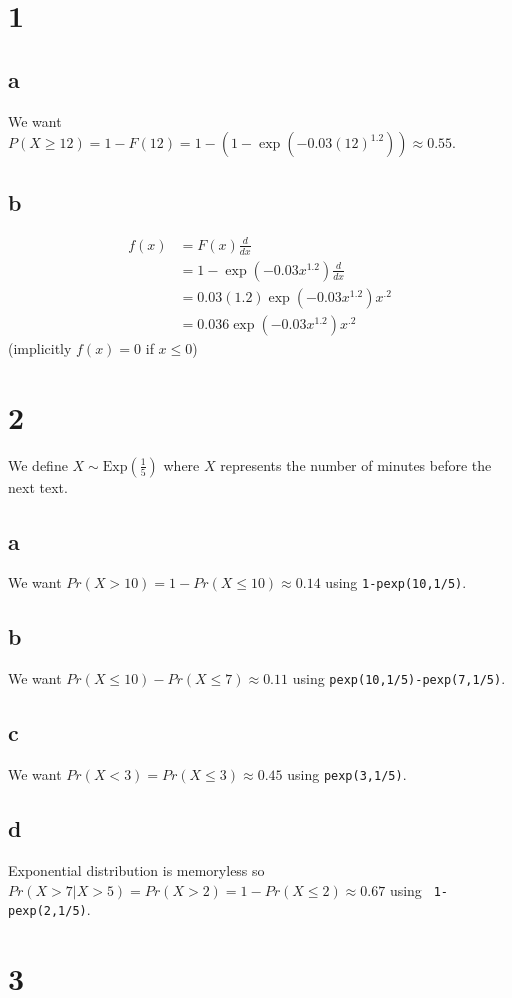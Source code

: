 \documentclass[10pt]{article}
\begin{document}
\section*{1}
\subsection*{a}
We want $P(X\ge12)=1-F(12) = 1 - (1-\exp(-0.03(12)^{1.2}))\approx0.55.$

\subsection*{b}
\begin{align*}
    f(x) &= F(x)\frac{d}{dx}\\
    &= 1-\exp(-0.03x^{1.2})\frac{d}{dx}\\
    &=0.03(1.2)\exp(-0.03x^{1.2})x^{.2}\\
    &= 0.036\exp(-0.03x^{1.2})x^{.2}
\end{align*}
\noindent
(implicitly $f(x)=0$ if $x\le0$)

\section*{2}
We define $X\sim\text{Exp}(\frac{1}{5})$ where $X$ represents the number of minutes before the next text.
\subsection*{a}
We want $Pr(X>10)=1-Pr(X\le10)\approx0.14$ using \texttt{1-pexp(10,1/5)}.
\subsection*{b}
We want $Pr(X\le10) - Pr(X\le7)\approx0.11$ using \texttt{pexp(10,1/5)-pexp(7,1/5)}.
\subsection*{c}
We want $Pr(X<3)=Pr(X\le3)\approx0.45$ using \texttt{pexp(3,1/5)}.
\subsection*{d}
Exponential distribution is memoryless so $Pr(X>7|X>5)=Pr(X>2)=1-Pr(X\le2)\approx0.67$ using \texttt{ 1-pexp(2,1/5)}.

\section*{3}
\end{document}
